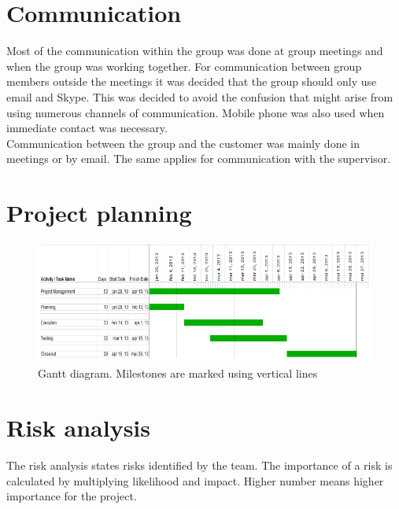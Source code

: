 \section{Communication}
Most of the communication within the group was done at group meetings and when the group was working together. For communication between group members outside the meetings it was decided that the group should only use email and Skype. This was decided to avoid the confusion that might arise from using numerous channels of communication. Mobile phone was also used when immediate contact was necessary.\\
\newline
Communication between the group and the customer was mainly done in meetings or by email. The same applies for communication with the supervisor.

\section{Project planning}

\begin{figure}[H]
\includegraphics[scale=0.8]{images/gantt-diagram.png}
\caption{Gantt diagram. Milestones are marked using vertical lines}
\end{figure}

\section{Risk analysis}
The risk analysis states risks identified by the team. The importance of a risk is calculated by multiplying likelihood and impact. Higher number means higher importance for the project. 

